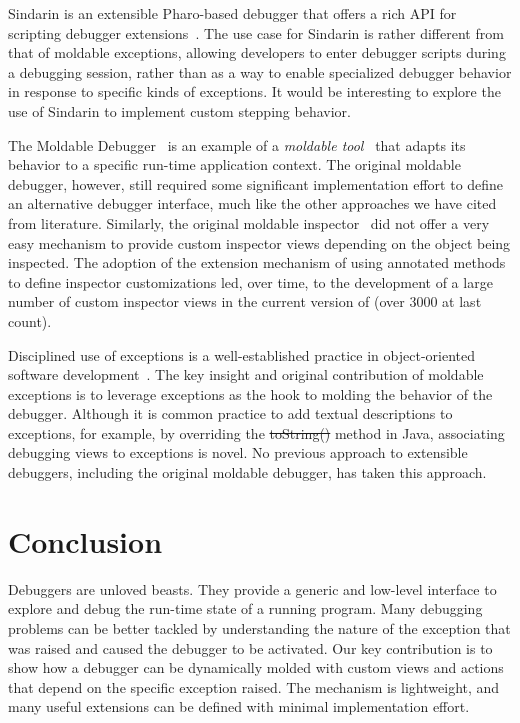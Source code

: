 \documentclass[sigplan,anonymous,review,10pt]{acmart}
\newcommand{\GT}{\lst{GT}\xspace} %
\begin{document}
Sindarin is an extensible Pharo-based debugger that offers a rich API for scripting debugger extensions~\cite{Dupr19a}.
The use case for Sindarin is rather different from that of moldable exceptions, allowing developers to enter debugger scripts during a debugging session, rather than as a way to enable specialized debugger behavior in response to specific kinds of exceptions.
It would be interesting to explore the use of Sindarin to implement custom stepping behavior.

The Moldable Debugger~\cite{Chis15c} is an example of a \emph{moldable tool}~\cite{Chis17a} that adapts its behavior to a specific run-time application context.
The original moldable debugger, however, still required some significant implementation effort to define an alternative debugger interface, much like the other approaches we have cited from literature.
Similarly, the original moldable inspector~\cite{Chis15a} did not offer a very easy mechanism to provide custom inspector views depending on the object being inspected.
The adoption of the extension mechanism of using annotated methods to define inspector customizations led, over time, to the development of a large number of custom inspector views in the current version of \GT (over 3000 at last count).

Disciplined use of exceptions is a well-established practice in object-oriented software development~\cite{Meye88a}.
The key insight and original contribution of moldable exceptions is to leverage exceptions as the hook to molding the behavior of the debugger.
Although it is common practice to add textual descriptions to exceptions, for example, by overriding the \st{toString()} method in Java, associating debugging views to exceptions is novel.
No previous approach to extensible debuggers, including the original moldable debugger, has taken this approach.

\section{Conclusion}\label{sec:conclusion}

Debuggers are unloved beasts.
They provide a generic and low-level interface to explore and debug the run-time state of a running program.
Many debugging problems can be better tackled by understanding the nature of the exception that was raised and caused the debugger to be activated.
Our key contribution is to show how a debugger can be dynamically molded with custom views and actions that depend on the specific exception raised.
The mechanism is lightweight, and many useful extensions can be defined with minimal implementation effort.




\end{document}
